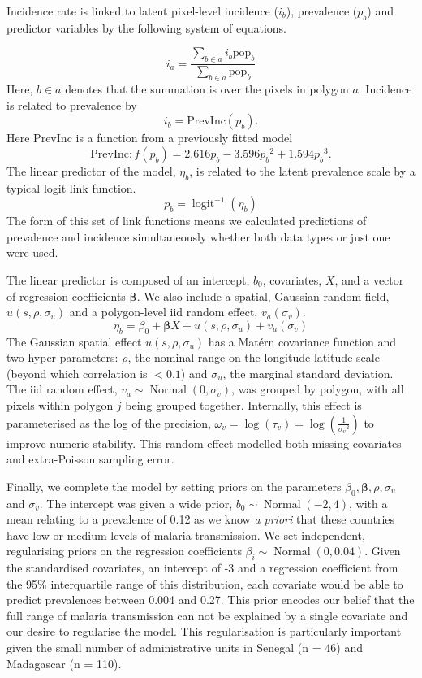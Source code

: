 \documentclass{statsoc}
\begin{document}
Incidence rate is linked to latent pixel-level incidence ($i_b$), prevalence ($p_b$) and predictor variables by the following system of equations.

$$i_a = \frac{ \sum_{b \in a}i_b \mathrm{pop}_b}{\sum_{b \in a}\mathrm{pop}_b} $$
Here, $b \in a$ denotes that the summation is over the pixels in polygon $a$. 
Incidence is related to prevalence by
$$i_b = \mathrm{PrevInc}(p_b).$$
Here $\mathrm{PrevInc}$ is a function from a previously fitted model \citep{cameron2015defining} 
$$\mathrm{PrevInc}: f\left(p_b\right) = 2.616p_b - 3.596{p_b}^2 + 1.594{p_b}^3.$$
The linear predictor of the model, $\eta_b$, is related to the latent prevalence scale by a typical logit link function.
$$p_b = \operatorname{logit}^{-1}(\eta_b)$$
The form of this set of link functions means we calculated predictions of prevalence and incidence simultaneously whether both data types or just one were used.

The linear predictor is composed of an intercept, $b_0$, covariates, $X$, and a vector of regression coefficients $\boldsymbol\beta$.
We also include a spatial, Gaussian random field, $u(s, \rho, \sigma_u)$ and a polygon-level iid random effect, $ v_a(\sigma_v)$.
$$\eta_b = \beta_0 + \boldsymbol\beta X  + u(s, \rho, \sigma_u) + v_a(\sigma_v) $$
The Gaussian spatial effect $u(s, \rho, \sigma_u)$ has a Mat\'ern covariance function and two hyper parameters: $\rho$, the nominal range on the longitude-latitude scale (beyond which correlation is $< 0.1$) and $\sigma_u$, the marginal standard deviation.
The iid random effect, $v_a \sim \operatorname{Normal}(0, \sigma_v)$,  was grouped by polygon, with all pixels within polygon $j$ being grouped together.
Internally, this effect is parameterised as the log of the precision, $\omega_v = \log(\tau_v) = \log(\frac{1}{{\sigma_v}^2})$ to improve numeric stability.
This random effect modelled both missing covariates and extra-Poisson sampling error.


Finally, we complete the model by setting priors on the parameters $\beta_0, \boldsymbol\beta, \rho, \sigma_u$ and $\sigma_v$.
The intercept was given a wide prior, $b_0 \sim \operatorname{Normal}(-2, 4)$, with a mean relating to a prevalence of 0.12 as we know \emph{a priori} that these countries have low or medium levels of malaria transmission.
We set independent, regularising priors on the regression coefficients $\beta_i \sim \operatorname{Normal}(0, 0.04)$. 
Given the standardised covariates, an intercept of -3 and a regression coefficient from the 95\% interquartile range of this distribution, each covariate would be able to predict prevalences between 0.004 and 0.27. 
This prior encodes our belief that the full range of malaria transmission can not be explained by a single covariate and our desire to regularise the model.
This regularisation is particularly important given the small number of administrative units in Senegal (n = 46) and Madagascar (n = 110).
\end{document}
